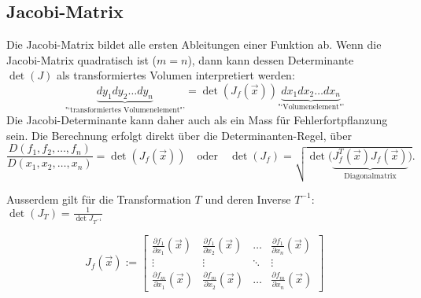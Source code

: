 \subsection{Jacobi-Matrix}
  \begin{minipage}{12cm}
    Die Jacobi-Matrix bildet alle ersten Ableitungen einer Funktion ab.
    Wenn die Jacobi-Matrix quadratisch ist ($m=n$), dann kann dessen Determinante $\det(J)$ als 
    transformiertes Volumen interpretiert werden:
    $$\underbrace{dy_1 dy_2 \ldots dy_n}_{\text{"`transformiertes Volumenelement"'}} = 
    \det(J_f(\vec{x})) \underbrace{dx_1 dx_2 \ldots dx_n}_{\text{"`Volumenelement"'}}$$
    Die Jacobi-Determinante kann daher auch als ein Mass für Fehlerfortpflanzung sein.
    Die Berechnung erfolgt direkt über die Determinanten-Regel, über 
    $$\frac{D(f_1, f_2, \ldots,f_n)}{D(x_1, x_2, \ldots, x_n)} = \det(J_f(\vec{x})) \quad \text{oder} \quad
    \det(J_f) = \sqrt{\det \Big( \underbrace{J_f^T(\vec{x}) J_f(\vec{x})}_{\text{Diagonalmatrix}} \Big)}.$$
    
    Ausserdem gilt für die Transformation $T$ und deren Inverse $T^{-1}$: $\det(J_T) = \frac{1}{\det{J_{T^{-1}}}}$
  \end{minipage}
  \hspace{5mm}
  \begin{minipage}{6cm}
    $$J_f(\vec{x}) :=  \begin{bmatrix}
    \frac{\partial f_1}{\partial x_1}(\vec{x}) & \frac{\partial f_1}{\partial x_2}(\vec{x}) & \ldots & \frac{\partial f_1}{\partial x_n}(\vec{x}) \\
    \vdots & \vdots & \ddots & \vdots \\
    \frac{\partial f_m}{\partial x_1}(\vec{x}) & \frac{\partial f_m}{\partial x_2}(\vec{x}) & \ldots & \frac{\partial f_m}{\partial x_n} (\vec{x})
    \end{bmatrix}$$
  \end{minipage}
  